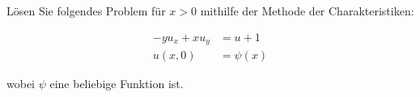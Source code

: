 
\begin{exercise}

Lösen Sie folgendes Problem für $x > 0$ mithilfe der Methode der Charakteristiken:

\begin{align*}
    -y u_x + x u_y
    & =
    u + 1 \\
    u(x, 0)
    & =
    \psi(x)
\end{align*}

wobei $\psi$ eine beliebige Funktion ist.

\end{exercise}


